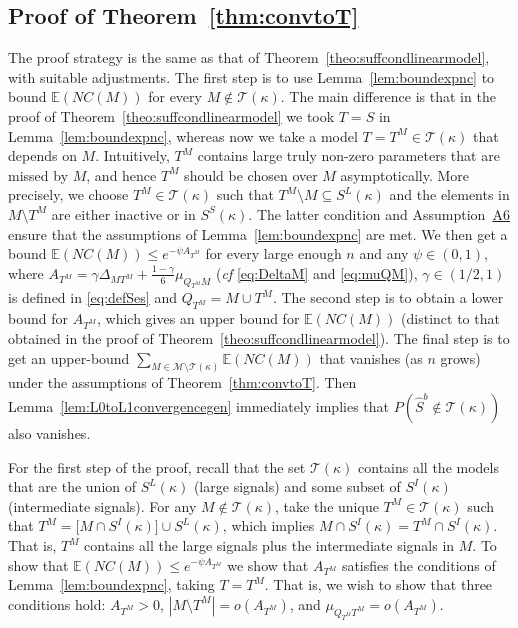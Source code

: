 \documentclass[bj,authoryear]{imsart}
\theoremstyle{plain}
\newcommand{\E}{\mathbb{E}}
\newcommand{\M}{\mathcal{M}}
\newcommand{\T}{\mathcal{T}}
\begin{document}
\subsection{Proof of Theorem~\ref{thm:convtoT}}
The proof strategy is the same as that of Theorem~\ref{theo:suffcondlinearmodel}, with suitable adjustments. 
The first step is to use Lemma~\ref{lem:boundexpnc} to bound $\E(NC(M))$ for every $M\not\in \T(\kappa)$. The main difference is that %
in the proof of Theorem~\ref{theo:suffcondlinearmodel} 
we took $T=S$ in Lemma~\ref{lem:boundexpnc}, whereas now we take  a model $T=T^M\in \T(\kappa)$
that depends on $M$. 
Intuitively, $T^M$ contains large truly non-zero parameters that are missed by $M$, and hence $T^M$ should be chosen over $M$ asymptotically. More precisely,
we choose $T^M\in \T(\kappa)$ such that %
$T^M\setminus M\subseteq S^L(\kappa)$ and the elements in $M\setminus T^M$ are either inactive or in $S^S(\kappa)$. The latter condition %
and Assumption~\hyperlink{lab:A6}{A6} ensure that the assumptions of Lemma~\ref{lem:boundexpnc} are met. We then get a bound $\E(NC(M)) \leq e^{-\psi A_{T^M}}$ for every large enough $n$ and any $\psi \in (0,1)$, where $A_{T^M}=\gamma\Delta_{MT^M}+\tfrac{1-\gamma}{6}\mu_{Q_{T^M}M}$ (\emph{cf} \eqref{eq:DeltaM} and \eqref{eq:muQM}), $\gamma\in(1/2,1)$ is defined in \eqref{eq:defSes} and $Q_{T^M}= M\cup T^M$. The second step is to obtain a lower bound for $A_{T^M}$, which gives an upper bound for $\E(NC(M))$ (distinct to that obtained in the proof of Theorem~\ref{theo:suffcondlinearmodel}).
The final step is to %
get an upper-bound $\sum_{M \in \M\setminus \T(\kappa)} \E\left(NC(M)\right)$ that vanishes (as $n$ grows) under the assumptions of Theorem~\ref{thm:convtoT}. Then Lemma~\ref{lem:L0toL1convergencegen} immediately implies that $P(\hat S^b\not \in \T(\kappa))$ also vanishes.

For the first step of the proof, recall that the set $\T(\kappa)$ contains all the models that are the union of $S^L(\kappa)$ (large signals) and some subset of $S^{I}(\kappa)$ (intermediate signals). For any $M \not\in\T(\kappa)$, take the unique $T^M\in\T(\kappa)$ such that $T^M = \big[M\cap S^{I}(\kappa)\big]\cup S^L(\kappa) $, which implies $M\cap S^{I}(\kappa)=T^M\cap S^{I}(\kappa)$. 
That is, $T^M$ contains all the large signals plus the intermediate signals in $M$.
To show that $\E(NC(M)) \leq e^{-\psi A_{T^M}}$ we show that $A_{T^M}$ satisfies the conditions of Lemma~\ref{lem:boundexpnc}, taking $T=T^M$. That is, we wish to show that three conditions hold: $A_{T^M}>0$, $|M\setminus T^M|=o(A_{T^M})$, and $\mu_{Q_{T^M} T^M}=o(A_{T^M})$.
\end{document}
